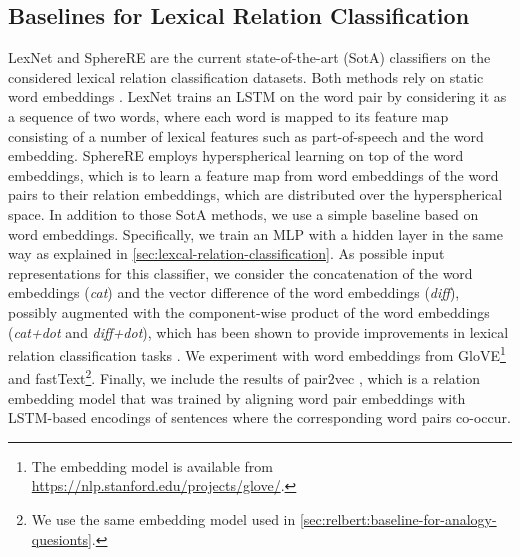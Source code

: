 \documentclass[3p]{elsarticle}
\begin{document}
{\subsection{Baselines for Lexical Relation Classification}\label{sec:relbert:baseline-for-lexical-relation-classification}
LexNet \cite{shwartz-dagan-2016-path} and SphereRE \cite{wang-etal-2019-spherere} are the current state-of-the-art (SotA) classifiers on the considered lexical relation classification datasets. Both methods rely on static word embeddings \cite{mikolov2013distributed,bojanowski-etal-2017-enriching}. LexNet trains an LSTM \cite{hochreiter1997long} on the word pair by considering it as a sequence of two words, where each word is mapped to its feature map consisting of a number of lexical features such as part-of-speech and the word embedding. SphereRE employs hyperspherical learning \cite{liu2017deep} on top of the word embeddings, which is to learn a feature map from word embeddings of the word pairs to their relation embeddings, which are distributed over the hyperspherical space. In addition to those SotA methods, we use a simple baseline based on word embeddings. Specifically, we train an MLP with a hidden layer in the same way as explained in \autoref{sec:lexcal-relation-classification}. As possible input representations for this classifier, we consider the concatenation of the word embeddings (\textit{cat}) and the vector difference of the word embeddings (\textit{diff}), possibly augmented with the component-wise product of the word embeddings (\textit{cat+dot} and \textit{diff+dot}), which has been shown to provide improvements in lexical relation classification tasks \cite{vu-shwartz-2018-integrating}. We experiment with word embeddings from GloVE\footnote{The embedding model is available from \url{https://nlp.stanford.edu/projects/glove/}.} \cite{pennington-etal-2014-glove} and fastText\footnote{We use the same embedding model used in \autoref{sec:relbert:baseline-for-analogy-quesionts}.}. Finally, we include the results of pair2vec \cite{joshi-etal-2019-pair2vec}, which is a relation embedding model that was trained by aligning word pair embeddings with LSTM-based encodings of sentences where the corresponding word pairs co-occur.

}
\end{document}
